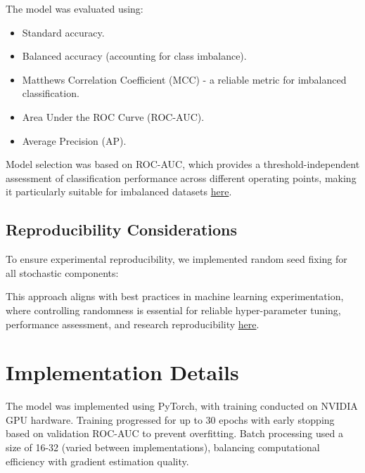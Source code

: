 \documentclass[a4paper,12pt]{article}
\begin{document}

The model was evaluated using:
\begin{itemize}
    \item Standard accuracy.
    \item Balanced accuracy (accounting for class imbalance).
    \item Matthews Correlation Coefficient (MCC) - a reliable metric for imbalanced classification.
    \item Area Under the ROC Curve (ROC-AUC).
    \item Average Precision (AP).
\end{itemize}

Model selection was based on ROC-AUC, which provides a threshold-independent assessment of classification performance across different operating points, making it particularly suitable for imbalanced datasets \href{https://dl.acm.org/doi/10.1145/1143844.1143874}{here}.

\subsection{Reproducibility Considerations}
To ensure experimental reproducibility, we implemented random seed fixing for all stochastic components:


This approach aligns with best practices in machine learning experimentation, where controlling randomness is essential for reliable hyper-parameter tuning, performance assessment, and research reproducibility \href{https://ieeexplore.ieee.org/stamp/stamp.jsp?tp=&arnumber=10533638&tag=}{here}.

\section{Implementation Details}
The model was implemented using PyTorch, with training conducted on NVIDIA GPU hardware. Training progressed for up to 30 epochs with early stopping based on validation ROC-AUC to prevent overfitting. Batch processing used a size of 16-32 (varied between implementations), balancing computational efficiency with gradient estimation quality.
\end{document}
